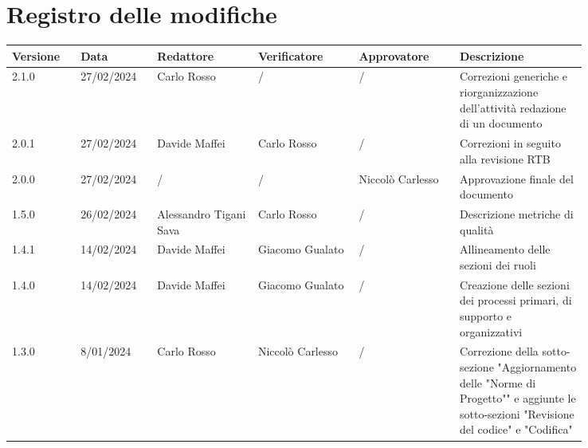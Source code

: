 \section*{Registro delle modifiche}
 {
  \scriptsize
  \begin{tabular}{p{0.10\linewidth}p{0.10\linewidth}p{0.15\linewidth}p{0.15\linewidth}p{0.15\linewidth}p{0.19\linewidth}}
	  \textbf{Versione} & \textbf{Data} & \textbf{Redattore}     & \textbf{Verificatore} & \textbf{Approvatore} & \textbf{Descrizione}                                                                                                                     \\
	  \toprule
	  2.1.0             & 27/02/2024    & Carlo Rosso            & /                     & /                    & Correzioni generiche e riorganizzazione dell'attività redazione di un documento                                                          \\
	  \hline
	  2.0.1             & 27/02/2024    & Davide Maffei          & Carlo Rosso           & /                    & Correzioni in seguito alla revisione RTB                                                                                                 \\
	  \hline
	  2.0.0             & 27/02/2024    & /                      & /                     & Niccolò Carlesso     & Approvazione finale del documento                                                                                                        \\
	  \hline
	  1.5.0             & 26/02/2024    & Alessandro Tigani Sava & Carlo Rosso           & /                    & Descrizione metriche di qualità                                                                                                          \\
	  \hline
	  1.4.1             & 14/02/2024    & Davide Maffei          & Giacomo Gualato       & /                    & Allineamento delle sezioni dei ruoli                                                                                                     \\
	  \hline
	  1.4.0             & 14/02/2024    & Davide Maffei          & Giacomo Gualato       & /                    & Creazione delle sezioni dei processi primari, di supporto e organizzativi                                                                \\
	  \hline
	  1.3.0             & 8/01/2024     & Carlo Rosso            & Niccolò Carlesso      & /                    & Correzione della sotto-sezione "Aggiornamento delle "Norme di Progetto"" e aggiunte le sotto-sezioni "Revisione del codice" e "Codifica" \\

\end{tabular}}
